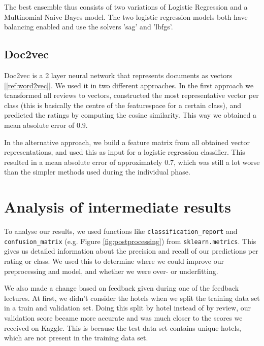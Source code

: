 \documentclass[a4paper,12pt]{article}
\begin{document}
The best ensemble thus consists of two variations of Logistic Regression and a Multinomial Naive Bayes model. The two logistic regression models both have balancing enabled and use the solvers 'sag' and 'lbfgs'. 

\subsection{Doc2vec}
Doc2vec is a 2 layer neural network that represents documents as vectors [\ref{ref:word2vec}]. We used it in two different approaches. In the first approach we transformed all reviews to vectors, constructed the most representative vector per class (this is basically the centre of the featurespace for a certain class), and predicted the ratings by computing the cosine similarity. This way we obtained a mean absolute error of $0.9$.

In the alternative approach, we build a feature matrix from all obtained vector representations, and used this as input for a logistic regression classifier. This resulted in a mean absolute error of approximately $0.7$, which was still a lot worse than the simpler methods used during the individual phase.

\section{Analysis of intermediate results}
To analyse our results, we used functions like \texttt{classification\_report} and \texttt{confusion\_{\allowbreak}matrix} (e.g. Figure \ref{fig:postprocessing}) from \texttt{sklearn.metrics}. This gives us detailed information about the precision and recall of our predictions per rating or class. We used this to determine where we could improve our preprocessing and model, and whether we were over- or underfitting.

We also made a change based on feedback given during one of the feedback lectures. At first, we didn't consider the hotels when we split the training data set in a train and validation set. Doing this split by hotel instead of by review, our validation score became more accurate and was much closer to the scores we received on Kaggle. This is because the test data set contains unique hotels, which are not present in the training data set.
\end{document}
